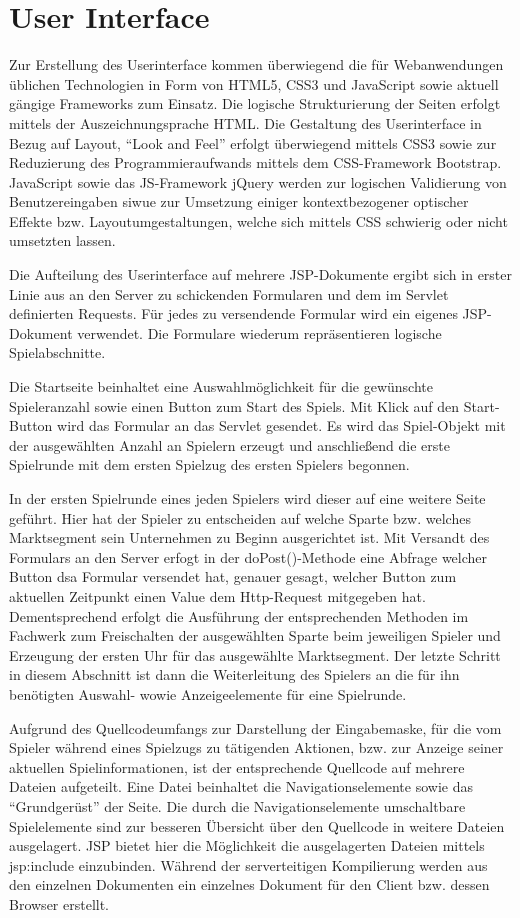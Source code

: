 \section{User Interface}\label{UI}
Zur Erstellung des Userinterface kommen überwiegend die für Webanwendungen üblichen Technologien in Form von HTML5, CSS3 und JavaScript sowie aktuell gängige Frameworks zum Einsatz. Die logische Strukturierung der Seiten erfolgt mittels der Auszeichnungsprache HTML. Die Gestaltung des Userinterface in Bezug auf Layout, \enquote{Look and Feel} erfolgt überwiegend mittels CSS3 sowie zur Reduzierung des Programmieraufwands mittels dem CSS-Framework Bootstrap. JavaScript sowie das JS-Framework jQuery werden zur logischen Validierung von Benutzereingaben siwue zur Umsetzung einiger kontextbezogener optischer Effekte bzw. Layoutumgestaltungen, welche sich mittels CSS schwierig oder nicht umsetzten lassen.

Die Aufteilung des Userinterface auf mehrere JSP-Dokumente ergibt sich in erster Linie aus an den Server zu schickenden Formularen und dem im Servlet definierten Requests. Für jedes zu versendende Formular wird ein eigenes JSP-Dokument verwendet. Die Formulare wiederum repräsentieren logische Spielabschnitte.

Die Startseite beinhaltet eine Auswahlmöglichkeit für die gewünschte Spieleranzahl sowie einen Button zum Start des Spiels. Mit Klick auf den Start-Button wird das Formular an das Servlet gesendet. Es wird das Spiel-Objekt mit der ausgewählten Anzahl an Spielern erzeugt und anschließend die erste Spielrunde mit dem ersten Spielzug des ersten Spielers begonnen.

In der ersten Spielrunde eines jeden Spielers wird dieser auf eine weitere Seite geführt. Hier hat der Spieler zu entscheiden auf welche Sparte bzw. welches Marktsegment sein Unternehmen zu Beginn ausgerichtet ist. Mit Versandt des Formulars an den Server erfogt in der doPost()-Methode eine Abfrage welcher Button dsa Formular versendet hat, genauer gesagt, welcher Button zum aktuellen Zeitpunkt einen Value dem Http-Request mitgegeben hat. Dementsprechend erfolgt die Ausführung der entsprechenden Methoden im Fachwerk zum Freischalten der ausgewählten Sparte beim jeweiligen Spieler und Erzeugung der ersten Uhr für das ausgewählte Marktsegment. Der letzte Schritt in diesem Abschnitt ist dann die Weiterleitung des Spielers an die für ihn benötigten Auswahl- wowie Anzeigeelemente für eine Spielrunde.

Aufgrund des Quellcodeumfangs zur Darstellung der Eingabemaske, für die vom Spieler während eines Spielzugs zu tätigenden Aktionen, bzw. zur Anzeige seiner aktuellen Spielinformationen, ist der entsprechende Quellcode auf mehrere Dateien aufgeteilt. Eine Datei beinhaltet die Navigationselemente sowie das \enquote{Grundgerüst} der Seite. Die durch die Navigationselemente umschaltbare Spielelemente sind zur besseren Übersicht über den Quellcode in weitere Dateien ausgelagert. JSP bietet hier die Möglichkeit die ausgelagerten Dateien mittels jsp:include einzubinden. Während der serverteitigen Kompilierung werden aus den einzelnen Dokumenten ein einzelnes Dokument für den Client bzw. dessen Browser erstellt. 

